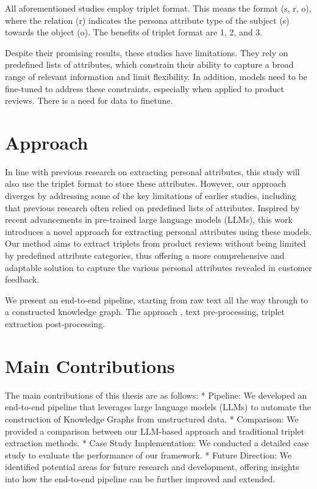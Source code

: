 \documentclass[
  letterpaper,
  a4paper,
  12pt,
  titlepage,
  oneside,
  openany]{book}
\begin{document}
All aforementioned studies employ triplet format. This means the format
(s, r, o), where the relation (r) indicates the persona attribute type
of the subject (s) towards the object (o). The benefits of triplet
format are 1, 2, and 3.

Despite their promising results, these studies have limitations. They
rely on predefined lists of attributes, which constrain their ability to
capture a broad range of relevant information and limit flexibility. In
addition, models need to be fine-tuned to address these constraints,
especially when applied to product reviews. There is a need for data to
finetune.

\hypertarget{approach}{%
\section{Approach}\label{approach}}

In line with previous research on extracting personal attributes, this
study will also use the triplet format to store these attributes.
However, our approach diverges by addressing some of the key limitations
of earlier studies, including that previous research often relied on
predefined lists of attributes. Inspired by recent advancements in
pre-trained large language models (LLMs), this work introduces a novel
approach for extracting personal attributes using these models. Our
method aims to extract triplets from product reviews without being
limited by predefined attribute categories, thus offering a more
comprehensive and adaptable solution to capture the various personal
attributes revealed in customer feedback.

We present an end-to-end pipeline, starting from raw text all the way
through to a constructed knowledge graph. The approach , text
pre-processing, triplet extraction post-processing.

\hypertarget{main-contributions}{%
\section{Main Contributions}\label{main-contributions}}

The main contributions of this thesis are as follows: * Pipeline: We
developed an end-to-end pipeline that leverages large language models
(LLMs) to automate the construction of Knowledge Graphs from
unstructured data. * Comparison: We provided a comparison between our
LLM-based approach and traditional triplet extraction methods. * Case
Study Implementation: We conducted a detailed case study to evaluate the
performance of our framework. * Future Direction: We identified
potential areas for future research and development, offering insights
into how the end-to-end pipeline can be further improved and extended.
\end{document}
